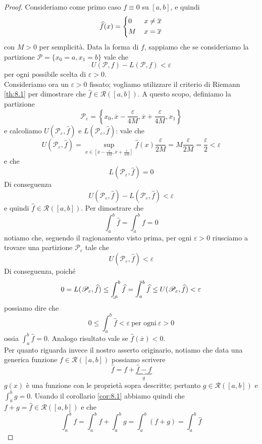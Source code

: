 \begin{proof}
    Consideriamo come primo caso $f\equiv 0$ su $[a,b]$, e quindi
    \[
    \widehat{f}(x) = \begin{dcases}
        0\, & x\ne \overline{x}\\
        M\, & x=\overline{x}
    \end{dcases}
    \]
    con $M>0$ per semplicità. Data la forma di $f$, sappiamo che se consideriamo la partizione $\mathscr{P}=\{x_0 = a, x_1 = b\}$ vale che
    \[
    U(\mathscr{P}, f) -L(\mathscr{P}, f) <\varepsilon
    \]
    per ogni possibile scelta di $\varepsilon>0$. \\
    Consideriamo ora un $\varepsilon>0$ fissato; vogliamo utilizzare il criterio di Riemann \ref{th:8.1} per dimostrare che $\widehat{f}\in\mathscr{R}([a,b])$. A questo scopo, definiamo la partizione
    \[
    \mathscr{P}_\varepsilon = \left\{x_0, \overline{x}-\frac{\varepsilon}{4M}, \overline{x}+\frac{\varepsilon}{4M}, x_1\right\}
    \]
    e calcoliamo $U(\mathscr{P}_\varepsilon, \widehat{f})$ e $L(\mathscr{P}_\varepsilon, \widehat{f})$: vale che
    \[
    U(\mathscr{P}_\varepsilon, \widehat{f}) = \sup_{x\in \left[\overline{x}-\frac{\varepsilon}{4M}, \overline{x}+\frac{\varepsilon}{4M}\right]} \widehat{f}(x) \frac{\varepsilon}{2M} = M \frac{\varepsilon}{2M} = \frac{\varepsilon}{2}<\varepsilon
    \]
    e che
    \[
    L(\mathscr{P}_\varepsilon, \widehat{f}) = 0 
    \]
    Di conseguenza 
    \[
    U(\mathscr{P}_\varepsilon, \widehat{f}) - L(\mathscr{P}_\varepsilon, \widehat{f})<\varepsilon 
    \]
    e quindi $\widehat{f}\in\mathscr{R}([a,b])$. Per dimostrare che
    \[
    \int_a^b \widehat{f} = \int_a^b f = 0
    \]
    notiamo che, seguendo il ragionamento visto prima, per ogni $\varepsilon>0$ riusciamo a trovare una partizione $\mathscr{P}_\varepsilon$ tale che 
    \[
    U(\mathscr{P}_\varepsilon, \widehat{f})<\varepsilon
    \]
    Di conseguenza, poiché
    \[
    0= L(\mathscr{P}_\varepsilon, \widehat{f}) \le \bint_a^b \widehat{f} = \aint_a^b \widehat{f} \le U(\mathscr{P}_\varepsilon, \widehat{f})<\varepsilon
    \]
    possiamo dire che
    \[
    0\le \int_a^b \widehat{f} < \varepsilon \ \text{per ogni} \ \varepsilon>0
    \]
    ossia $\int_a^b \widehat{f} = 0$. Analogo risultato vale se $\widehat{f}(\overline{x})<0$.\\
    Per quanto riguarda invece il nostro asserto originario, notiamo che data una generica funzione $f\in\mathscr{R}([a,b])$ possiamo scrivere
    \[
    \widehat{f} = f + \underbrace{\widehat{f}-f}_{g}
    \]
    $g(x)$ è una funzione con le proprietà sopra descritte; pertanto $g\in\mathscr{R}([a,b])$ e $\int_a^b g = 0$. Usando il corollario \ref{cor:8.1} abbiamo quindi che $f+g = \widehat{f}\in\mathscr{R}([a,b])$ e che
    \[
    \int_a^b f = \int_a^b f + \int_a^b g = \int_a^b(f+g) = \int_a^b \widehat{f}
    \]
\end{proof}
